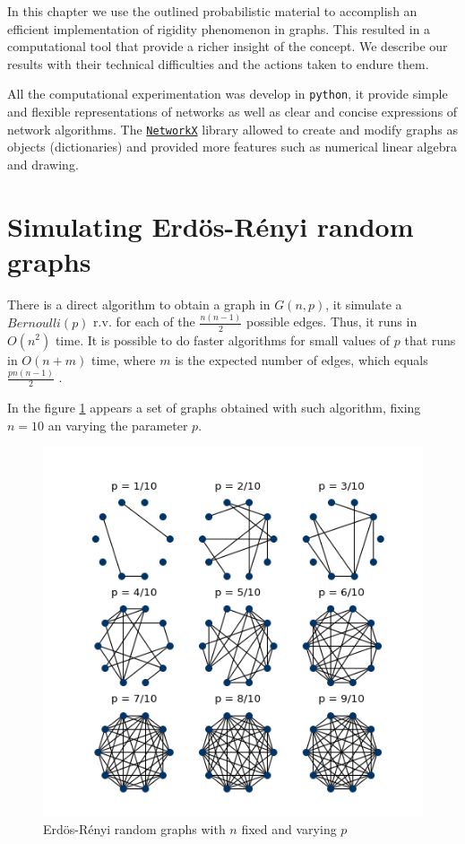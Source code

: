 In this chapter we use the outlined probabilistic material to accomplish an efficient implementation of rigidity phenomenon in graphs. This resulted in a computational tool that provide a richer insight of the concept. We describe our results with their technical difficulties and the actions taken to endure them.

All the computational experimentation was develop in \texttt{python}, it provide simple and flexible representations of networks as well as clear and concise expressions of network algorithms. The \texttt{\href{https://networkx.github.io/}{NetworkX}} library allowed to create and modify graphs as objects (dictionaries) and provided more features such as numerical linear algebra and drawing.

\section{Simulating Erdös-Rényi random graphs}

There is a direct algorithm to obtain a graph in $G(n,p)$, it simulate a $Bernoulli(p)$ r.v. for each of the $\frac{n(n-1)}{2}$ possible edges. Thus, it runs in $O(n^2)$ time. It is possible to do faster algorithms for small values of $p$ that runs in $O(n + m)$ time, where $m$ is the expected number of edges, which equals $\frac{pn(n - 1)}{2}$ \cite{fastER}.

In the figure \ref{fig:ErdosRenyi10} appears a set of graphs obtained with such algorithm, fixing $n=10$ an varying the parameter $p$.

\begin{figure}[h]
	\centering
	\includegraphics[scale=0.85]{Figures/ER-10.png}
	\caption{Erdös-Rényi random graphs with $n$ fixed and varying $p$}
	\label{fig:ErdosRenyi10}
\end{figure}

